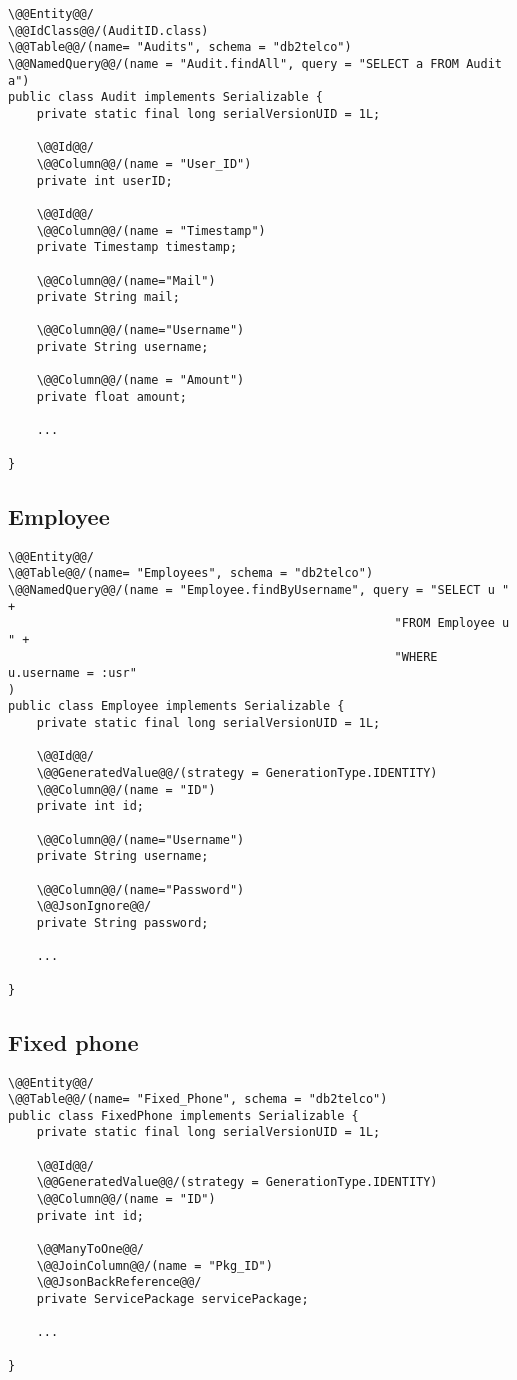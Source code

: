 \begin{lstlisting}[style = JPA]
\@@Entity@@/
\@@IdClass@@/(AuditID.class)
\@@Table@@/(name= "Audits", schema = "db2telco")
\@@NamedQuery@@/(name = "Audit.findAll", query = "SELECT a FROM Audit a")
public class Audit implements Serializable {
    private static final long serialVersionUID = 1L;

    \@@Id@@/
    \@@Column@@/(name = "User_ID")
    private int userID;

    \@@Id@@/
    \@@Column@@/(name = "Timestamp")
    private Timestamp timestamp;

    \@@Column@@/(name="Mail")
    private String mail;

    \@@Column@@/(name="Username")
    private String username;

    \@@Column@@/(name = "Amount")
    private float amount;

    ...

}
\end{lstlisting}

\subsection*{Employee}

\begin{lstlisting}[style = JPA]
\@@Entity@@/
\@@Table@@/(name= "Employees", schema = "db2telco")
\@@NamedQuery@@/(name = "Employee.findByUsername", query = "SELECT u " + 
                                                      "FROM Employee u " + 
                                                      "WHERE u.username = :usr"
)
public class Employee implements Serializable {
    private static final long serialVersionUID = 1L;

    \@@Id@@/
    \@@GeneratedValue@@/(strategy = GenerationType.IDENTITY)
    \@@Column@@/(name = "ID")
    private int id;

    \@@Column@@/(name="Username")
    private String username;

    \@@Column@@/(name="Password")
    \@@JsonIgnore@@/
    private String password;

    ...

}
\end{lstlisting}

\subsection*{Fixed phone}

\begin{lstlisting}[style = JPA]
\@@Entity@@/
\@@Table@@/(name= "Fixed_Phone", schema = "db2telco")
public class FixedPhone implements Serializable {
    private static final long serialVersionUID = 1L;

    \@@Id@@/
    \@@GeneratedValue@@/(strategy = GenerationType.IDENTITY)
    \@@Column@@/(name = "ID")
    private int id;

    \@@ManyToOne@@/
    \@@JoinColumn@@/(name = "Pkg_ID")
    \@@JsonBackReference@@/
    private ServicePackage servicePackage;

    ...

}
\end{lstlisting}

